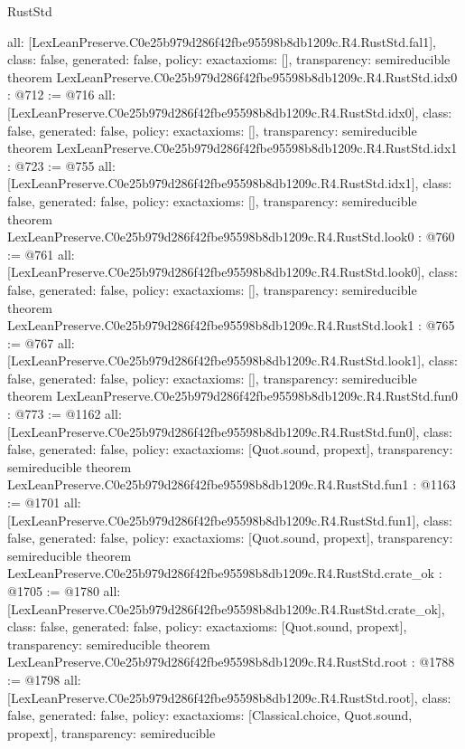 \begin{lexlean}{RustStd}
\begin{coremodule}
{  all: [LexLeanPreserve.C0e25b979d286f42fbe95598b8db1209c.R4.RustStd.fal1],
  class: false,
  generated: false,
  policy: exact{axioms: []},
  transparency: semireducible
}
theorem LexLeanPreserve.C0e25b979d286f42fbe95598b8db1209c.R4.RustStd.idx0 : @712 := @716 {
  all: [LexLeanPreserve.C0e25b979d286f42fbe95598b8db1209c.R4.RustStd.idx0],
  class: false,
  generated: false,
  policy: exact{axioms: []},
  transparency: semireducible
}
theorem LexLeanPreserve.C0e25b979d286f42fbe95598b8db1209c.R4.RustStd.idx1 : @723 := @755 {
  all: [LexLeanPreserve.C0e25b979d286f42fbe95598b8db1209c.R4.RustStd.idx1],
  class: false,
  generated: false,
  policy: exact{axioms: []},
  transparency: semireducible
}
theorem LexLeanPreserve.C0e25b979d286f42fbe95598b8db1209c.R4.RustStd.look0 : @760 := @761 {
  all: [LexLeanPreserve.C0e25b979d286f42fbe95598b8db1209c.R4.RustStd.look0],
  class: false,
  generated: false,
  policy: exact{axioms: []},
  transparency: semireducible
}
theorem LexLeanPreserve.C0e25b979d286f42fbe95598b8db1209c.R4.RustStd.look1 : @765 := @767 {
  all: [LexLeanPreserve.C0e25b979d286f42fbe95598b8db1209c.R4.RustStd.look1],
  class: false,
  generated: false,
  policy: exact{axioms: []},
  transparency: semireducible
}
theorem LexLeanPreserve.C0e25b979d286f42fbe95598b8db1209c.R4.RustStd.fun0 : @773 := @1162 {
  all: [LexLeanPreserve.C0e25b979d286f42fbe95598b8db1209c.R4.RustStd.fun0],
  class: false,
  generated: false,
  policy: exact{axioms: [Quot.sound, propext]},
  transparency: semireducible
}
theorem LexLeanPreserve.C0e25b979d286f42fbe95598b8db1209c.R4.RustStd.fun1 : @1163 := @1701 {
  all: [LexLeanPreserve.C0e25b979d286f42fbe95598b8db1209c.R4.RustStd.fun1],
  class: false,
  generated: false,
  policy: exact{axioms: [Quot.sound, propext]},
  transparency: semireducible
}
theorem LexLeanPreserve.C0e25b979d286f42fbe95598b8db1209c.R4.RustStd.crate_ok : @1705 := @1780 {
  all: [LexLeanPreserve.C0e25b979d286f42fbe95598b8db1209c.R4.RustStd.crate_ok],
  class: false,
  generated: false,
  policy: exact{axioms: [Quot.sound, propext]},
  transparency: semireducible
}
theorem LexLeanPreserve.C0e25b979d286f42fbe95598b8db1209c.R4.RustStd.root : @1788 := @1798 {
  all: [LexLeanPreserve.C0e25b979d286f42fbe95598b8db1209c.R4.RustStd.root],
  class: false,
  generated: false,
  policy: exact{axioms: [Classical.choice, Quot.sound, propext]},
  transparency: semireducible
}


\end{coremodule}
\end{lexlean}

